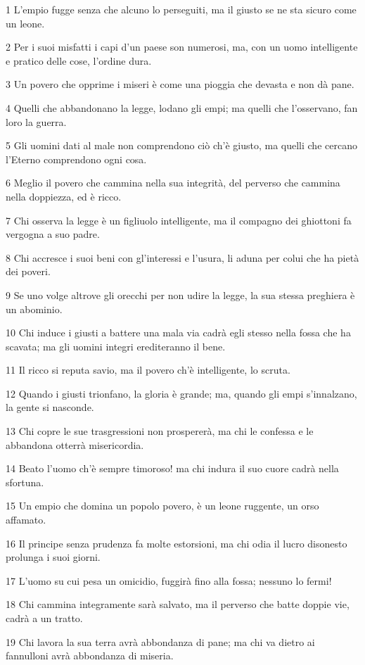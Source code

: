\par 1 L'empio fugge senza che alcuno lo perseguiti, ma il giusto se ne sta sicuro come un leone.
\par 2 Per i suoi misfatti i capi d'un paese son numerosi, ma, con un uomo intelligente e pratico delle cose, l'ordine dura.
\par 3 Un povero che opprime i miseri è come una pioggia che devasta e non dà pane.
\par 4 Quelli che abbandonano la legge, lodano gli empi; ma quelli che l'osservano, fan loro la guerra.
\par 5 Gli uomini dati al male non comprendono ciò ch'è giusto, ma quelli che cercano l'Eterno comprendono ogni cosa.
\par 6 Meglio il povero che cammina nella sua integrità, del perverso che cammina nella doppiezza, ed è ricco.
\par 7 Chi osserva la legge è un figliuolo intelligente, ma il compagno dei ghiottoni fa vergogna a suo padre.
\par 8 Chi accresce i suoi beni con gl'interessi e l'usura, li aduna per colui che ha pietà dei poveri.
\par 9 Se uno volge altrove gli orecchi per non udire la legge, la sua stessa preghiera è un abominio.
\par 10 Chi induce i giusti a battere una mala via cadrà egli stesso nella fossa che ha scavata; ma gli uomini integri erediteranno il bene.
\par 11 Il ricco si reputa savio, ma il povero ch'è intelligente, lo scruta.
\par 12 Quando i giusti trionfano, la gloria è grande; ma, quando gli empi s'innalzano, la gente si nasconde.
\par 13 Chi copre le sue trasgressioni non prospererà, ma chi le confessa e le abbandona otterrà misericordia.
\par 14 Beato l'uomo ch'è sempre timoroso! ma chi indura il suo cuore cadrà nella sfortuna.
\par 15 Un empio che domina un popolo povero, è un leone ruggente, un orso affamato.
\par 16 Il principe senza prudenza fa molte estorsioni, ma chi odia il lucro disonesto prolunga i suoi giorni.
\par 17 L'uomo su cui pesa un omicidio, fuggirà fino alla fossa; nessuno lo fermi!
\par 18 Chi cammina integramente sarà salvato, ma il perverso che batte doppie vie, cadrà a un tratto.
\par 19 Chi lavora la sua terra avrà abbondanza di pane; ma chi va dietro ai fannulloni avrà abbondanza di miseria.
